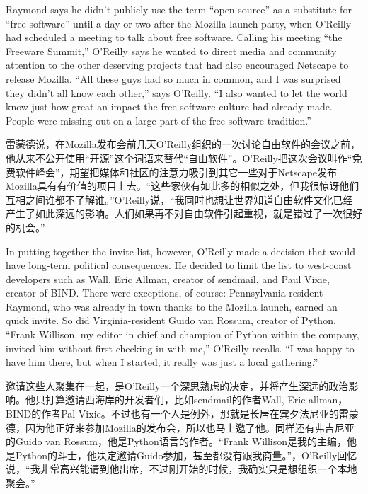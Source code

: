\ifdefined\eng
Raymond says he didn't publicly use the term ``open source'' as a substitute for ``free software'' until a day or two after the Mozilla launch party, when O'Reilly had scheduled a meeting to talk about free software. Calling his meeting ``the Freeware Summit,'' O'Reilly says he wanted to direct media and community attention to the other deserving projects that had also encouraged Netscape to release Mozilla. ``All these guys had so much in common, and I was surprised they didn't all know each other,'' says O'Reilly. ``I also wanted to let the world know just how great an impact the free software culture had already made. People were missing out on a large part of the free software tradition.''
\fi

\ifdefined\chs
雷蒙德说，在Mozilla发布会前几天O'Reilly组织的一次讨论自由软件的会议之前，他从来不公开使用``开源''这个词语来替代``自由软件''。O'Reilly把这次会议叫作``免费软件峰会''，期望把媒体和社区的注意力吸引到其它一些对于Netscape发布Mozilla具有有价值的项目上去。``这些家伙有如此多的相似之处，但我很惊讶他们互相之间谁都不了解谁。''O'Reilly说，``我同时也想让世界知道自由软件文化已经产生了如此深远的影响。人们如果再不对自由软件引起重视，就是错过了一次很好的机会。''
\fi

\ifdefined\eng
In putting together the invite list, however, O'Reilly made a decision that would have long-term political consequences. He decided to limit the list to west-coast developers such as Wall, Eric Allman, creator of sendmail, and Paul Vixie, creator of BIND. There were exceptions, of course: Pennsylvania-resident Raymond, who was already in town thanks to the Mozilla launch, earned an quick invite. So did Virginia-resident Guido van Rossum, creator of Python. ``Frank Willison, my editor in chief and champion of Python within the company, invited him without first checking in with me,'' O'Reilly recalls. ``I was happy to have him there, but when I started, it really was just a local gathering.''
\fi

\ifdefined\chs
邀请这些人聚集在一起，是O'Reilly一个深思熟虑的决定，并将产生深远的政治影响。他只打算邀请西海岸的开发者们，比如sendmail的作者Wall, Eric allman，BIND的作者Pal Vixie。不过也有一个人是例外，那就是长居在宾夕法尼亚的雷蒙德，因为他正好来参加Mozilla的发布会，所以也马上邀了他。同样还有弗吉尼亚的Guido van Rossum，他是Python语言的作者。``Frank Willison是我的主编，他是Python的斗士，他决定邀请Guido参加，甚至都没有跟我商量。''，O'Reilly回忆说，``我非常高兴能请到他出席，不过刚开始的时候，我确实只是想组织一个本地聚会。''
\fi

